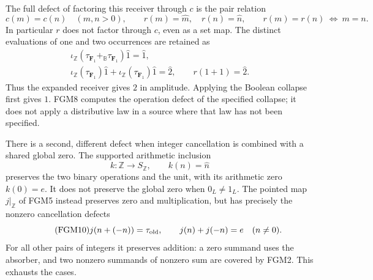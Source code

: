 The full defect of factoring this receiver through $c$ is the pair
relation
\begin{equation}\tag{FGM7}
 c(m)=c(n)\quad(m,n>0),\qquad
 r(m)=\widehat m,\quad r(n)=\widehat n,\qquad
 r(m)=r(n)\ \Longleftrightarrow\ m=n.
\end{equation}
In particular $r$ does not factor through $c$, even as a set map.
The distinct evaluations of one and two occurrences are retained as
\begin{equation}\tag{FGM8}
 \begin{gathered}
 \iota_{\mathbb Z}(\tau_{\mathbf F_1}+_{\mathbb B}
       \tau_{\mathbf F_1})\widehat1=\widehat1,\\
 \iota_{\mathbb Z}(\tau_{\mathbf F_1})\widehat1+
 \iota_{\mathbb Z}(\tau_{\mathbf F_1})\widehat1=\widehat2,
 \qquad r(1+1)=\widehat2.
 \end{gathered}
\end{equation}
Thus the expanded receiver gives $2$ in amplitude. Applying the
Boolean collapse first gives $1$. FGM8 computes the operation defect
of the specified collapse; it does not apply a distributive law in
a source where that law has not been specified.

There is a second, different defect when integer cancellation is
combined with a shared global zero. The supported arithmetic inclusion
\begin{equation}\tag{FGM9}
 k:\mathbb Z\longrightarrow S_{\mathbb Z},\qquad k(n)=\widehat n
\end{equation}
preserves the two binary operations and the unit, with its arithmetic
zero $k(0)=e$. It does not preserve the global zero when $0_L\ne1_L$.
The pointed map $j|_{\mathbb Z}$ of FGM5 instead preserves zero and
multiplication, but has precisely the nonzero cancellation defects
\begin{equation}\tag{FGM10}
 j(n+(-n))=\tau_{\rm old},\qquad
 j(n)+j(-n)=e\quad(n\ne0).
\end{equation}
For all other pairs of integers it preserves addition: a zero
summand uses the absorber, and two nonzero summands of nonzero sum
are covered by FGM2. This exhausts the cases.

